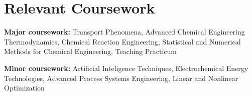\documentclass[letterpaper,11pt]{article}
\newcommand{\resumeSubHeadingListStart}{\begin{itemize}[leftmargin=0.15in, label={}]}
\newcommand{\resumeSubHeadingListEnd}{\end{itemize}}
\begin{document}

\section{Relevant Coursework}
\vspace{2pt}
\resumeSubHeadingListStart
  \small{\item{
      \textbf{Major coursework:}{ Transport Phenomena, Advanced Chemical Engineering Thermodynamics, Chemical Reaction Engineering, Statistical and Numerical Methods for Chemical Engineering, Teaching Practicum} \\ \vspace{3pt}
      
      \textbf{Minor coursework:}{ Artificial Inteligence Techniques, Electrochemical Energy Technologies, Advanced Process Systems Engineering, Linear and Nonlinear Optimization}
  }}
\resumeSubHeadingListEnd














\end{document}
